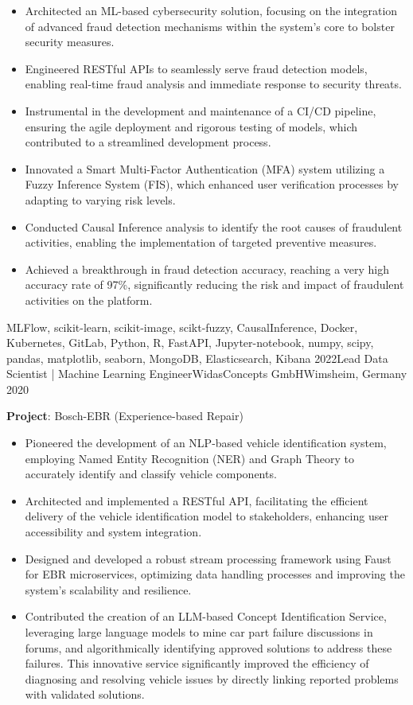 \begin{experiences}
{\begin{itemize}
		\item Architected an ML-based cybersecurity solution, focusing on the integration of advanced fraud detection mechanisms within the system's core to bolster security measures.
		\item Engineered RESTful APIs to seamlessly serve fraud detection models, enabling real-time fraud analysis and immediate response to security threats.
		\item Instrumental in the development and maintenance of a CI/CD pipeline, ensuring the agile deployment and rigorous testing of models, which contributed to a streamlined development process.
		\item Innovated a Smart Multi-Factor Authentication (MFA) system utilizing a Fuzzy Inference System (FIS), which enhanced user verification processes by adapting to varying risk levels.
		\item Conducted Causal Inference analysis to identify the root causes of fraudulent activities, enabling the implementation of targeted preventive measures.
		\item Achieved a breakthrough in fraud detection accuracy, reaching a very high accuracy rate of 97\%, significantly reducing the risk and impact of fraudulent activities on the platform.
	\end{itemize}
}
{MLFlow, scikit-learn, scikit-image, scikt-fuzzy, CausalInference, Docker, Kubernetes, GitLab, Python, R,  FastAPI, Jupyter-notebook, numpy, scipy, pandas, matplotlib, seaborn, MongoDB, Elasticsearch, Kibana}
\emptySeparator
\experience
{2022}{Lead Data Scientist | Machine Learning Engineer}{WidasConcepts GmbH}{Wimsheim, Germany}
{2020} {
	\vspace{0.1cm}
	\textbf{Project}: Bosch-EBR (Experience-based Repair)
	\begin{itemize}
		\item Pioneered the development of an NLP-based vehicle identification system, employing Named Entity Recognition (NER) and Graph Theory to accurately identify and classify vehicle components.
		\item Architected and implemented a RESTful API, facilitating the efficient delivery of the vehicle identification model to stakeholders, enhancing user accessibility and system integration.
		\item Designed and developed a robust stream processing framework using Faust for EBR microservices, optimizing data handling processes and improving the system's scalability and resilience.
		\item Contributed the creation of an LLM-based Concept Identification Service, leveraging large language models to mine car part failure discussions in forums, and algorithmically identifying approved solutions to address these failures. This innovative service significantly improved the efficiency of diagnosing and resolving vehicle issues by directly linking reported problems with validated solutions.

\end{itemize}}
\end{experiences}

